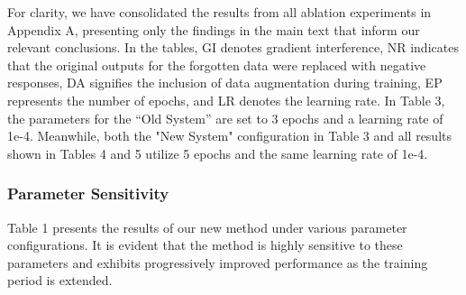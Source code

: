 \documentclass[11pt]{article}
\begin{document}
For clarity, we have consolidated the results from all ablation experiments in Appendix A, presenting only the findings in the main text that inform our relevant conclusions. In the tables, GI denotes gradient interference, NR indicates that the original outputs for the forgotten data were replaced with negative responses, DA signifies the inclusion of data augmentation during training, EP represents the number of epochs, and LR denotes the learning rate. 
In Table 3, the parameters for the “Old System” are set to 3 epochs and a learning rate of 1e-4. 
Meanwhile, both the "New System" configuration in Table 3 and all results shown in Tables 4 and 5 utilize 5 epochs and the same learning rate of 1e-4.




\subsubsection{Parameter Sensitivity}  

Table 1 presents the results of our new method under various parameter configurations. It is evident that the method is highly sensitive to these parameters and exhibits progressively improved performance as the training period is extended.

\end{document}
